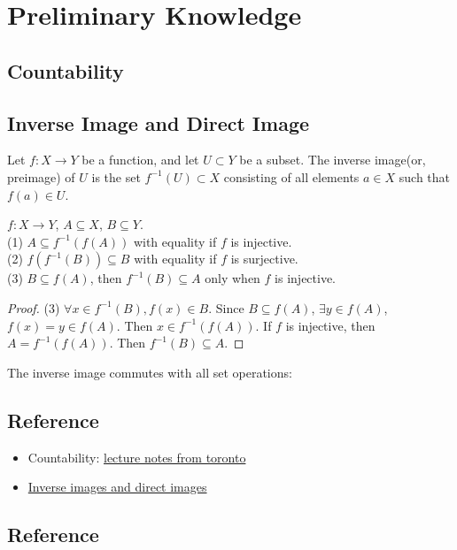 \chapter{Preliminary Knowledge}\label{chp:0_1}

\section{Countability}

\section{Inverse Image and Direct Image}

\begin{definition}{}{}
    Let $f:X\rightarrow Y$ be a function, and let $U\subset Y$ be a subset.
    The inverse image(or, preimage) of $U$ is the set $f^{-1}(U)\subset X$ consisting of all elements $a\in X$
    such that $f(a)\in U$.
\end{definition}

\begin{proposition}{}{}
    $f:X\rightarrow Y$, $A\subseteq X$, $B\subseteq Y$.\\
    (1) $A\subseteq f^{-1}(f(A))$ with equality if $f$ is injective.\\
    (2) $f(f^{-1}(B))\subseteq B$ with equality if $f$ is surjective.\\
    (3) $B\subseteq f(A)$, then $f^{-1}(B)\subseteq A$ only when $f$ is injective.\\
\end{proposition}

\begin{proof}
    (3) $\forall x\in f^{-1}(B), f(x)\in B$. Since $B\subseteq f(A)$, $\exists y\in f(A)$, $f(x)=y\in f(A)$.
    Then $x\in f^{-1}(f(A))$. If $f$ is injective, then $A=f^{-1}(f(A))$. Then $f^{-1}(B)\subseteq A$.
\end{proof}

The inverse image commutes with all set operations:


\section{Reference}
\begin{itemize}
    \item Countability: \href{https://www.math.toronto.edu/ivan/mat327/docs/notes/04-countability.pdf}{lecture notes from toronto}
    \item \href{https://web.northeastern.edu/suciu/U565/MATH4565-sp10-handout1.pdf}{Inverse images and direct images}
\end{itemize}
\section{Reference}
